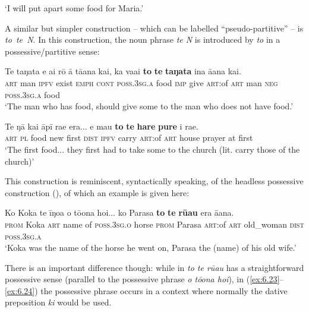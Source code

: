 \glt 
‘I will put apart some food for Maria.’ \textstyleExampleref{[Notes]}
\z

A similar but simpler construction – which can be labelled “pseudo-partitive” – is \textit{to~te~N}. In this construction, the noun phrase \textit{te N} is introduced by \textit{to} in a possessive/partitive sense: 

\ea\label{ex:6.23}
\gll Te taŋata e ai rō {\ꞌ}ā tā{\ꞌ}ana kai, ka va{\ꞌ}ai \textbf{to} \textbf{te} \textbf{taŋata}  {\ꞌ}ina {\ꞌ}ā{\ꞌ}ana kai.\\
\textsc{art} man \textsc{ipfv} exist \textsc{emph} \textsc{cont} \textsc{poss.3sg.a} food \textsc{imp} give \textsc{art}:of \textsc{art} man  \textsc{neg} \textsc{poss.3sg.a} food\\

\glt 
‘The man who has food, should give some to the man who does not have food.’ \textstyleExampleref{[Luke 3:11]}
\z

\ea\label{ex:6.24}
\gll Te ŋā kai {\ꞌ}āpī ra{\ꞌ}e era... e ma{\ꞌ}u \textbf{to} \textbf{te} \textbf{hare} \textbf{pure} {\ꞌ}i ra{\ꞌ}e. \\
\textsc{art} \textsc{pl} food new first \textsc{dist} \textsc{ipfv} carry \textsc{art}:of \textsc{art} house prayer at first \\

\glt
‘The first food... they first had to take some to the church (lit. carry those of the church)’ \textstyleExampleref{[R539-3.150]}
\z

This construction is reminiscent, syntactically speaking, of the headless possessive construction (), of which an example is given here: 

\ea\label{ex:6.25}
\gll Ko Koka te {\ꞌ}īŋoa o tō{\ꞌ}ona hoi... ko Parasa  \textbf{to} \textbf{te} \textbf{rū{\ꞌ}au} era {\ꞌ}ā{\ꞌ}ana.\\
\textsc{prom} Koka \textsc{art} name of \textsc{poss.3sg.o} horse \textsc{prom} Parasa  \textsc{art}:of \textsc{art} old\_woman \textsc{dist} \textsc{poss.3sg.a}\\

\glt
‘Koka was the name of the horse he went on, Parasa the (name) of his old wife.’ \textstyleExampleref{[R539-1.420]}
\z

There is an important difference though: while in  \textit{to te rū{\ꞌ}au} has a straightforward possessive sense (parallel to the possessive phrase \textit{o tō{\ꞌ}ona hoi}), in (\ref{ex:6.23}–\ref{ex:6.24}) the possessive phrase occurs in a context where normally the dative preposition \textit{ki} would be used.

